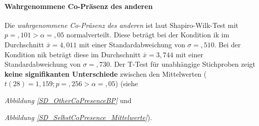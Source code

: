 \documentclass[a4paper,11pt]{article}%
\renewcommand{\\}{\vspace*{0.5\baselineskip} \newline}
\begin{document}
{{{{{{{{{{{{{{{{\paragraph{Wahrgenommene Co-Präsenz des anderen}
Die \textit{wahrgenommene Co-Präsenz des anderen} ist laut Shapiro-Wilk-Test mit $p =,101 > \alpha = ,05$ normalverteilt.
Diese beträgt bei der Kondition \ac{ik} im Durchschnitt $\bar{x} = 4,011$ mit einer Standardabweichung von $\sigma =,510$.
Bei der Kondition \ac{nik} beträgt diese im Durchschnitt $\bar{x} = 3,744$ mit einer Standardabweichung von $\sigma = ,730$. 
Der T-Test für unabhängige Stichproben zeigt \textbf{keine signifikanten Unterschiede} zwischen den Mittelwerten ($t(28) = 1,159; p =,256 > \alpha = ,05$) (siehe {\textit{Abbildung \ref{SD_OtherCoPresenceBP}} und {\textit{Abbildung \ref{SD_SelbstCoPresence_Mittelwerte}}).

}}}}}}}}}}}}}}}}}}
\end{document}
